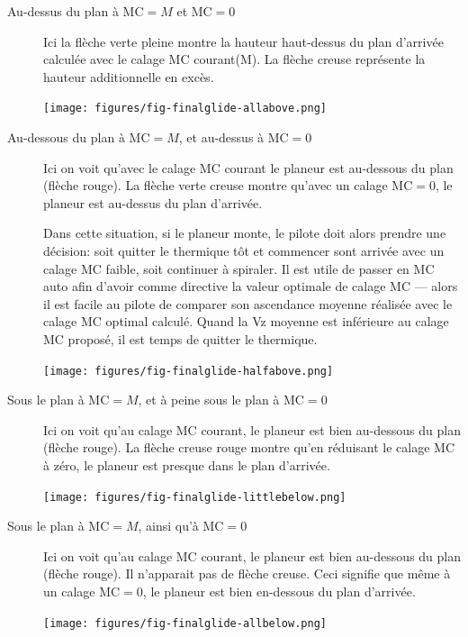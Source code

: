 \begin{description}

\item[Au-dessus du plan à MC$=M$ et MC$=0$]
  Ici la flèche verte pleine montre la hauteur haut-dessus du plan d'arrivée calculée avec le calage MC courant(M). La flèche creuse représente la hauteur additionnelle en excès.

\begin{center}
\texttt{[image: figures/fig-finalglide-allabove.png]}
\end{center}

\item[Au-dessous du plan à MC$=M$, et au-dessus à MC$=0$]
  Ici on voit qu'avec le calage MC courant le planeur est au-dessous du plan (flèche rouge). La flèche verte creuse montre qu'avec un calage MC$=0$, le planeur est au-dessus du plan d'arrivée.

Dans cette situation, si le planeur monte, le pilote doit alors prendre une décision: soit quitter le thermique tôt et commencer sont arrivée avec un calage MC faible, soit continuer à spiraler. Il est utile de passer en MC auto afin d'avoir comme directive la valeur optimale de calage MC  --- alors il est facile au pilote de comparer son ascendance moyenne réalisée avec le calage MC optimal calculé. Quand la Vz moyenne est inférieure au calage MC proposé, il est temps de quitter le thermique.

\begin{center}
\texttt{[image: figures/fig-finalglide-halfabove.png]}
\end{center}

\item[Sous le plan à MC$=M$, et à peine sous le plan à MC$=0$]
  Ici on voit qu'au calage MC courant, le planeur est bien au-dessous du plan (flèche rouge). La flèche creuse rouge montre qu'en réduisant le calage MC à zéro, le planeur est presque dans le plan d'arrivée.
\begin{center}
\texttt{[image: figures/fig-finalglide-littlebelow.png]}
\end{center}

\item[Sous le plan à MC$=M$, ainsi qu'à  MC$=0$]
  Ici on voit qu'au calage MC courant, le planeur est bien au-dessous du plan (flèche rouge). Il n'apparait pas de flèche creuse. Ceci signifie que même à un calage MC$=0$, le planeur est bien en-dessous du plan d'arrivée.
\begin{center}
\texttt{[image: figures/fig-finalglide-allbelow.png]}
\end{center}
\end{description}


